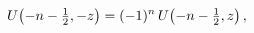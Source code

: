 \[\mathop{U\/}\nolimits\!\left(-n-\tfrac{1}{2},-z\right)=(-1)^{n}\mathop{U\/}%
\nolimits\!\left(-n-\tfrac{1}{2},z\right),\]